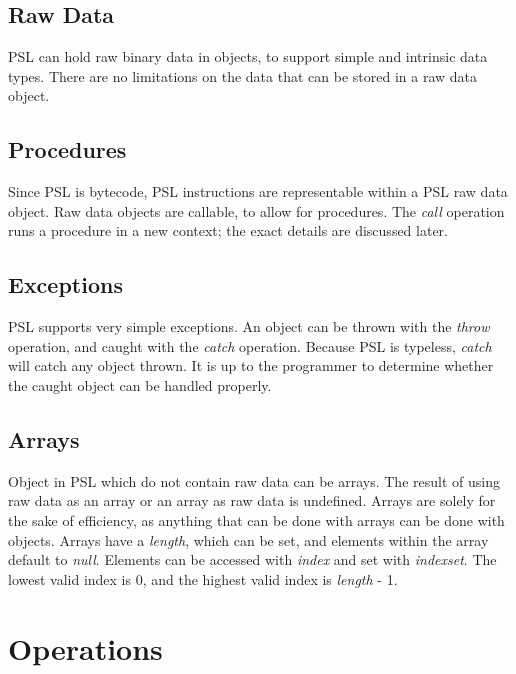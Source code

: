 \subsection{Raw Data}

PSL can hold raw binary data in objects, to support simple and intrinsic data types. There are no limitations on the data that can be stored in a raw data object.



\subsection{Procedures}

Since PSL is bytecode, PSL instructions are representable within a PSL raw data object. Raw data objects are callable, to allow for procedures. The \textit{call} operation runs a procedure in a new context; the exact details are discussed later.



\subsection{Exceptions}

PSL supports very simple exceptions. An object can be thrown with the \textit{throw} operation, and caught with the \textit{catch} operation. Because PSL is typeless, \textit{catch} will catch any object thrown. It is up to the programmer to determine whether the caught object can be handled properly.



\subsection{Arrays}

Object in PSL which do not contain raw data can be arrays. The result of using raw data as an array or an array as raw data is undefined. Arrays are solely for the sake of efficiency, as anything that can be done with arrays can be done with objects. Arrays have a \textit{length}, which can be set, and elements within the array default to \textit{null}. Elements can be accessed with \textit{index} and set with \textit{indexset}. The lowest valid index is 0, and the highest valid index is \textit{length} - 1.



\section{Operations}

